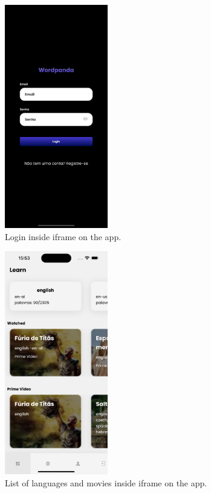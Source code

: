 \documentclass[12pt]{article}
\begin{document}
  \begin{figure}
    \centering
    \caption{
    Login inside iframe on the app.
    }
    \label{fig:app1}
    \includegraphics[width=0.4\textwidth]{assets/14.png}
  \end{figure}

  \begin{figure}
    \centering
    \caption{
     List of languages and movies inside iframe on the app.
    }
    \label{fig:app2}
    \includegraphics[width=0.4\textwidth]{assets/15.png}
  \end{figure}
\end{document}
